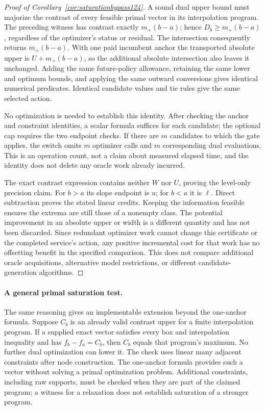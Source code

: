 \begin{proof}[Proof of Corollary~\ref{cor:saturationbypass124}]
A sound dual upper bound must majorize the contrast of every feasible
primal vector in its interpolation program. The preceding witness
has contrast exactly $m_+(b-a)$; hence $D_b\ge m_+(b-a)$, regardless
of the optimizer's status or residual. The intersection consequently
returns $m_+(b-a)$. With one paid incumbent anchor the transported
absolute upper is $U+m_+(b-a)$, so the additional absolute intersection
also leaves it unchanged. Adding the same future-policy allowance,
retaining the same lower and optimum bounds, and applying the same
outward conversions gives identical numerical predicates. Identical
candidate values and tie rules give the same selected action.

No optimization is needed to establish this identity. After checking
the anchor and constraint identities, a scalar formula suffices for
each candidate; the optional cap requires the two endpoint checks.
If there are $m$ candidates to which the gate applies, the switch
omits $m$ optimizer calls and $m$ corresponding dual evaluations.
This is an operation count, not a claim about measured elapsed time,
and the identity does not delete any oracle work already incurred.

The exact contrast expression contains neither $W$ nor $U$, proving
the level-only precision claim. For $b>a$ its slope endpoint is $u$;
for $b<a$ it is $\ell$. Direct subtraction proves the stated linear
credits. Keeping the information feasible ensures the extrema are
still those of a nonempty class. The potential improvement in an
absolute upper or width is a different quantity and has not been
discarded. Since redundant optimizer work cannot change this
certificate or the completed service's action, any positive incremental
cost for that work has no offsetting benefit in the specified comparison.
This does not compare additional oracle acquisitions, alternative
model restrictions, or different candidate-generation algorithms.
\end{proof}

\paragraph{A general primal saturation test.}
The same reasoning gives an implementable extension beyond the one-anchor
formula. Suppose $C_b$ is an already valid contrast upper for a finite
interpolation program. If a supplied exact vector satisfies every box
and interpolation inequality and has $f_b-f_a=C_b$, then $C_b$ equals
that program's maximum. No further dual optimization can lower it.
The check uses linear many adjacent constraints after node construction.
The one-anchor formula provides such a vector without solving a primal
optimization problem. Additional constraints, including raw supports,
must be checked when they are part of the claimed program; a witness
for a relaxation does not establish saturation of a stronger program.

